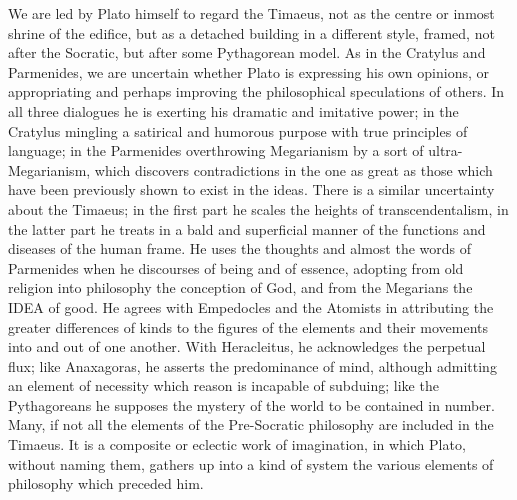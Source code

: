 We are led by Plato himself to regard the Timaeus, not as the centre or
inmost shrine of the edifice, but as a detached building in a different
style, framed, not after the Socratic, but after some Pythagorean model.
As in the Cratylus and Parmenides, we are uncertain whether Plato is
expressing his own opinions, or appropriating and perhaps improving the
philosophical speculations of others. In all three dialogues he is
exerting his dramatic and imitative power; in the Cratylus mingling a
satirical and humorous purpose with true principles of language; in the
Parmenides overthrowing Megarianism by a sort of ultra-Megarianism, which
discovers contradictions in the one as great as those which have been
previously shown to exist in the ideas. There is a similar uncertainty
about the Timaeus; in the first part he scales the heights of
transcendentalism, in the latter part he treats in a bald and superficial
manner of the functions and diseases of the human frame. He uses the
thoughts and almost the words of Parmenides when he discourses of being
and of essence, adopting from old religion into philosophy the conception
of God, and from the Megarians the IDEA of good. He agrees with Empedocles
and the Atomists in attributing the greater differences of kinds to the
figures of the elements and their movements into and out of one another.
With Heracleitus, he acknowledges the perpetual flux; like Anaxagoras, he
asserts the predominance of mind, although admitting an element of
necessity which reason is incapable of subduing; like the Pythagoreans he
supposes the mystery of the world to be contained in number. Many, if not
all the elements of the Pre-Socratic philosophy are included in the
Timaeus. It is a composite or eclectic work of imagination, in which
Plato, without naming them, gathers up into a kind of system the various
elements of philosophy which preceded him.

